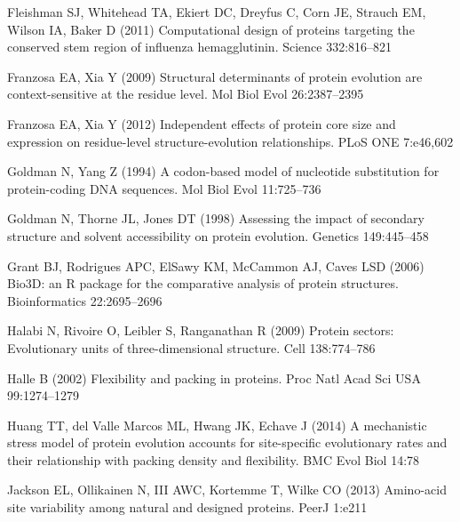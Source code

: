 \documentclass[smallextended]{svjour3}
\begin{document}
\begin{thebibliography}{59}
Fleishman SJ, Whitehead TA, Ekiert DC, Dreyfus C, Corn JE, Strauch EM, Wilson
  IA, Baker D (2011) Computational design of proteins targeting the conserved
  stem region of influenza hemagglutinin. Science 332:816--821

Franzosa EA, Xia Y (2009) Structural determinants of protein evolution are
  context-sensitive at the residue level. Mol Biol Evol 26:2387--2395

Franzosa EA, Xia Y (2012) Independent effects of protein core size and
  expression on residue-level structure-evolution relationships. PLoS ONE
  7:e46,602

Goldman N, Yang Z (1994) A codon-based model of nucleotide substitution for
  protein-coding {DNA} sequences. Mol Biol Evol 11:725--736

Goldman N, Thorne JL, Jones DT (1998) Assessing the impact of secondary
  structure and solvent accessibility on protein evolution. Genetics
  149:445--458

Grant BJ, Rodrigues APC, ElSawy KM, McCammon AJ, Caves LSD (2006) {Bio3D:} an
  {R} package for the comparative analysis of protein structures.
  Bioinformatics 22:2695--2696

Halabi N, Rivoire O, Leibler S, Ranganathan R (2009) Protein sectors:
  Evolutionary units of three-dimensional structure. Cell 138:774--786

Halle B (2002) Flexibility and packing in proteins. Proc Natl Acad Sci USA
  99:1274--1279

Huang TT, {del Valle Marcos} ML, Hwang JK, Echave J (2014) A mechanistic stress
  model of protein evolution accounts for site-specific evolutionary rates and
  their relationship with packing density and flexibility. BMC Evol Biol 14:78

Jackson EL, Ollikainen N, III AWC, Kortemme T, Wilke CO (2013) Amino-acid site
  variability among natural and designed proteins. PeerJ 1:e211


\end{thebibliography}
\end{document}
